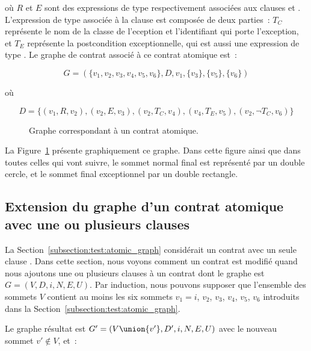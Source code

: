 où $R$ et $E$ sont des expressions de type  respectivement
associées aux clauses \arequires et \aensures. L'expression de type
 associée à la clause \athrowable est composée de
deux parties~: $T_C$ représente le nom de la classe de l'eception et
l'identifiant qui porte l'exception, et $T_E$ représente la postcondition
exceptionnelle, qui est aussi une expression de type . Le
graphe de contrat associé à ce contrat atomique est~:

$$G = (
    \{v_1, v_2, v_3, v_4, v_5, v_6\},
    D,
    v_1,
    \{v_3\},
    \{v_5\},
    \{v_6\}
)$$

où

$$D = \{
    (v_1, R, v_2),
    (v_2, E, v_3),
    (v_2, T_C, v_4),
    (v_4, T_E, v_5),
    (v_2, \neg T_C, v_6)
\}$$

\begin{figure}


\caption{\label{figure:test:atomic_graph} Graphe correspondant à un contrat
atomique.}

\end{figure}

La Figure~\ref{figure:test:atomic_graph} présente graphiquement ce graphe. Dans
cette figure ainsi que dans toutes celles qui vont suivre, le sommet normal
final est représenté par un double cercle, et le sommet final exceptionnel par
un double rectangle.

\subsection{Extension du graphe d'un contrat atomique avec une ou plusieurs
clauses \athrowable}
\label{subsection:test:throwable_graph}

La Section~\ref{subsection:test:atomic_graph} considérait un contrat avec un
seule clause \athrowable. Dans cette section, nous voyons comment un contrat est
modifié quand nous ajoutons une ou plusieurs clauses  à un contrat dont le graphe est $G = (V, D, i, N, E, U)$. Par
induction, nous pouvons supposer que l'ensemble des sommets $V$ contient au
moins les six sommets $v_1 = i$, $v_2$, $v_3$, $v_4$, $v_5$, $v_6$ introduits
dans la Section~\ref{subsection:test:atomic_graph}.

Le graphe résultat est $G' = (V \union \{v'\}, D', i, N, E, U)$ avec le nouveau
sommet $v' \notin V$, et~:

